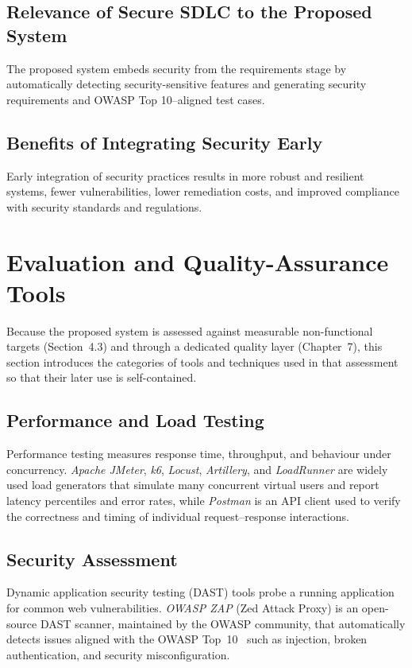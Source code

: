 \documentclass[12pt,a4paper,oneside]{report}
\begin{document}
\subsection{Relevance of Secure SDLC to the Proposed System}
The proposed system embeds security from the requirements stage by automatically detecting security-sensitive features and generating security requirements and OWASP Top 10--aligned test cases.

\subsection{Benefits of Integrating Security Early}
Early integration of security practices results in more robust and resilient systems, fewer vulnerabilities, lower remediation costs, and improved compliance with security standards and regulations.

\section{Evaluation and Quality-Assurance Tools}
Because the proposed system is assessed against measurable non-functional targets (Section~4.3) and through a dedicated quality layer (Chapter~7), this section introduces the categories of tools and techniques used in that assessment so that their later use is self-contained.

\subsection{Performance and Load Testing}
Performance testing measures response time, throughput, and behaviour under concurrency. \emph{Apache JMeter}, \emph{k6}, \emph{Locust}, \emph{Artillery}, and \emph{LoadRunner} are widely used load generators that simulate many concurrent virtual users and report latency percentiles and error rates, while \emph{Postman} is an API client used to verify the correctness and timing of individual request--response interactions.

\subsection{Security Assessment}
Dynamic application security testing (DAST) tools probe a running application for common web vulnerabilities. \emph{OWASP ZAP} (Zed Attack Proxy) is an open-source DAST scanner, maintained by the OWASP community, that automatically detects issues aligned with the OWASP Top~10~\cite{ref11} such as injection, broken authentication, and security misconfiguration.
\end{document}
